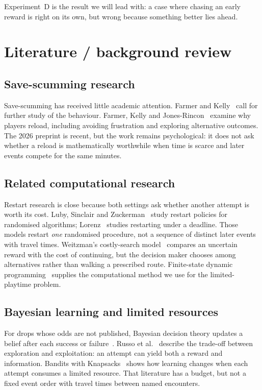\documentclass[11pt,a4paper]{article}
\begin{document}
Experiment~D is the result we will lead with: a case where chasing an early reward is right on its own, but wrong because something better lies ahead.

\section{Literature / background review}

\subsection{Save-scumming research}
Save-scumming has received little academic attention. Farmer and Kelly~\cite{farmer2024} call for further study of the behaviour. Farmer, Kelly and Jones-Rincon~\cite{farmer2025,farmer2026} examine why players reload, including avoiding frustration and exploring alternative outcomes. The 2026 preprint is recent, but the work remains psychological: it does not ask whether a reload is mathematically worthwhile when time is scarce and later events compete for the same minutes.

\subsection{Related computational research}
Restart research is close because both settings ask whether another attempt is worth its cost. Luby, Sinclair and Zuckerman~\cite{luby1993} study restart policies for randomised algorithms; Lorenz~\cite{lorenz2016} studies restarting under a deadline. Those models restart \emph{one} randomised procedure, not a sequence of distinct later events with travel times. Weitzman's costly-search model~\cite{weitzman1979} compares an uncertain reward with the cost of continuing, but the decision maker chooses among alternatives rather than walking a prescribed route. Finite-state dynamic programming~\cite{sargent2025} supplies the computational method we use for the limited-playtime problem.

\subsection{Bayesian learning and limited resources}
For drops whose odds are not published, Bayesian decision theory updates a belief after each success or failure~\cite{degroot2004}. Russo et al.~\cite{russo2018} describe the trade-off between exploration and exploitation: an attempt can yield both a reward and information. Bandits with Knapsacks~\cite{badanidiyuru2018} shows how learning changes when each attempt consumes a limited resource. That literature has a budget, but not a fixed event order with travel times between named encounters.
\end{document}
